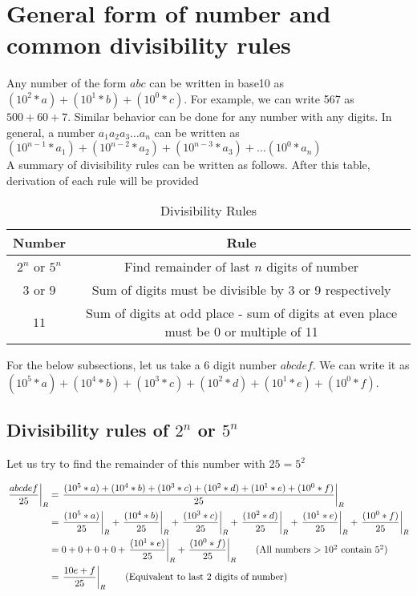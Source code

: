 \section{General form of number and common divisibility rules}

Any number of the form $abc$ can be written in base10 as $( 10^2 * a ) + ( 10^1 * b ) + ( 10^0 * c )$. For example, we can write 567 as $500 + 60 + 7$. Similar behavior can be done for any number with any digits. In general, a number $a_1 a_2 a_3 \ldots a_n$ can be written as $(10^{n-1} * a_1) + (10^{n-2} * a_2) + (10^{n-3} * a_3) + \ldots (10^{0} * a_n)$ \\

A summary of divisibility rules can be written as follows. After this table, derivation of each rule will be provided

\begin{table}[h!]
    \centering
    \begin{tabular}{|| c | c ||}
         \hline
         \textbf{Number} & \textbf{Rule} \\
         \hline
         $2^n$ or $5^n$ & Find remainder of last $n$ digits of number \\ 
         $3$ or $9$ & Sum of digits must be divisible by 3 or 9 respectively \\ 
         $11$ & Sum of digits at odd place - sum of digits at even place must be 0 or multiple of 11 \\ 
         \hline
    \end{tabular}
    \caption{Divisibility Rules}
\end{table}

For the below subsections, let us take a 6 digit number $abcdef$. We can write it as $(10^5 * a) + (10^4 * b) + (10^3 * c) + (10^2 * d) + (10^1 * e) + (10^0 * f)$. 

\subsection{Divisibility rules of $2^n$ or $5^n$}

Let us try to find the remainder of this number with $25 = 5^2$

\begin{align*}
    \displaystyle{ \left. \frac{abcdef}{25} \right |_{R} } &= \displaystyle{ \left. \frac{(10^5 * a) + (10^4 * b) + (10^3 * c) + (10^2 * d) + (10^1 * e) + (10^0 * f)}{25} \right |_{R} } \\
    &= \displaystyle{ \left. \frac{(10^5 * a)}{25} \right |_{R} } + \displaystyle{ \left. \frac{(10^4 * b)}{25} \right |_{R} } + \displaystyle{ \left. \frac{(10^3 * c)}{25} \right |_{R} } + \displaystyle{ \left. \frac{(10^2 * d)}{25} \right |_{R} } + \displaystyle{ \left. \frac{(10^1 * e)}{25} \right |_{R} } + \displaystyle{ \left. \frac{(10^0 * f)}{25} \right |_{R} } \\
    &= 0 + 0 + 0 + 0 + \displaystyle{ \left. \frac{(10^1 * e)}{25} \right |_{R} } + \displaystyle{ \left. \frac{(10^0 * f)}{25} \right |_{R} } \tag{All numbers $> 10^2$ contain $5^2$} \\
    &= \displaystyle{ \left. \frac{10e + f}{25} \right |_{R} } \tag{Equivalent to last 2 digits of number} \\
\end{align*}

